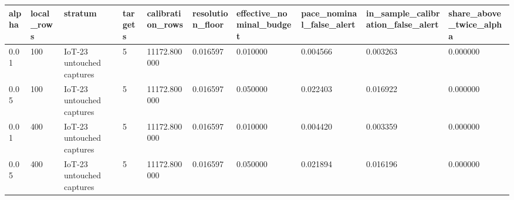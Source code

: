 \begin{tabular}{llllllllll}
\toprule
alpha & local\_rows & stratum & targets & calibration\_rows & resolution\_floor & effective\_nominal\_budget & pace\_nominal\_false\_alert & in\_sample\_calibration\_false\_alert & share\_above\_twice\_alpha \\
\midrule
0.01 & 100 & IoT-23 untouched captures & 5 & 11172.800000 & 0.016597 & 0.010000 & 0.004566 & 0.003263 & 0.000000 \\
0.05 & 100 & IoT-23 untouched captures & 5 & 11172.800000 & 0.016597 & 0.050000 & 0.022403 & 0.016922 & 0.000000 \\
0.01 & 400 & IoT-23 untouched captures & 5 & 11172.800000 & 0.016597 & 0.010000 & 0.004420 & 0.003359 & 0.000000 \\
0.05 & 400 & IoT-23 untouched captures & 5 & 11172.800000 & 0.016597 & 0.050000 & 0.021894 & 0.016196 & 0.000000 \\
\bottomrule
\end{tabular}
